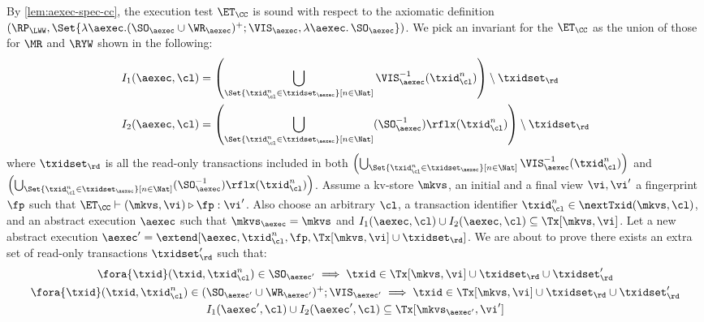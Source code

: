 By \cref{lem:aexec-spec-cc}, the execution test $\ET_\CC$ is sound with respect to the axiomatic definition 
\( (\RP_{\LWW}, \Set{\lambda \aexec. ( \SO_{\aexec} \cup \WR_{\aexec} )^{+} ; \VIS_{\aexec}, \lambda \aexec \ldotp \SO_\aexec })\).
We pick an invariant for the \( \ET_\CC \) as the union of those for \( \MR\) and \( \RYW \) shown in the following:
\begin{align*}
    I_1(\aexec, \cl) & =  \left( \bigcup_{\Set{\txid_{\cl}^{n} \in \txidset_{\aexec} }[ n \in \Nat ]} \VIS_{\aexec}^{-1}(\txid^n_\cl) \right) \setminus \txidset_\rd \\
    I_2(\aexec, \cl) & =  \left( \bigcup_{\Set{\txid_{\cl}^{n} \in \txidset_{\aexec} }[ n \in \Nat ]} (\SO_{\aexec}^{-1})\rflx(\txid^n_\cl) \right) \setminus \txidset_\rd
\end{align*}
where \( \txidset_\rd \) is all the read-only transactions included in both 
\( \left( \bigcup_{\Set{\txid_{\cl}^{n} \in \txidset_{\aexec} }[ n \in \Nat ]} \VIS_{\aexec}^{-1}(\txid^n_\cl) \right)\) 
and \( \left( \bigcup_{\Set{\txid_{\cl}^{n} \in \txidset_{\aexec} }[ n \in \Nat ]} (\SO_{\aexec}^{-1})\rflx(\txid^n_\cl) \right) \).
Assume a kv-store $\mkvs$, an initial and a final view $\vi, \vi'$  a fingerprint $\fp$ 
such that $\ET_{\CC} \vdash (\mkvs, \vi) \triangleright \fp: \vi'$. 
Also choose an arbitrary $\cl$, a transaction identifier $\txid_\cl^n \in \nextTxid(\mkvs, \cl)$, 
and an abstract execution $\aexec$ such that $\mkvs_{\aexec} = \mkvs$ and 
\( I_1(\aexec, \cl) \cup I_2(\aexec, \cl) \subseteq \Tx[\mkvs, \vi] \).
Let a new abstract execution \( \aexec' = \extend[\aexec, \txid_\cl^n, \fp, \Tx[\mkvs, \vi] \cup \txidset_\rd] \).
We are about to prove there exists an extra set of read-only transactions \( \txidset'_\rd \) such that:
\begin{gather}
    \fora{\txid} (\txid, \txid_\cl^n) \in \SO_{\aexec'} \implies \txid \in \Tx[\mkvs, \vi] \cup \txidset_\rd \cup \txidset'_\rd \label{equ:cc-sound-update-so}\\
    \fora{\txid} (\txid, \txid_\cl^n) \in ( \SO_{\aexec'} \cup \WR_{\aexec'} )^{+} ; \VIS_{\aexec'} \implies \txid \in \Tx[\mkvs, \vi] \cup \txidset_\rd \cup \txidset'_\rd \label{equ:cc-sound-update-visvis}\\
    I_1(\aexec',\cl) \cup I_2(\aexec',\cl) \subseteq \Tx[\mkvs_{\aexec'}, \vi'] \label{equ:cc-sound-inv} 
\end{gather}

